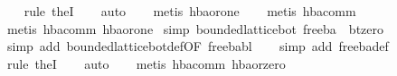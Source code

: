 \begin{isabellebody}
\ \ \isamarkupfalse%
\ {}rule\ the{}I{}{}\isanewline
\ \ \isamarkupfalse%
\ auto\isanewline
\ \ \isamarkupfalse%
\ {}metis\ hba{}or{}one{}\isanewline
\ \ \isamarkupfalse%
\ {}metis\ hba{}comm{}\isanewline
\ \ \isamarkupfalse%
\ {}metis\ hba{}comm\ hba{}or{}one{}%
\endisatagproof
{\isafoldproof}%
%
\isadelimproof
\isanewline
%
\endisadelimproof
\isanewline
{}\isamarkupfalse%
\ {}simp{}{}\ {}bounded{}lattice{}bot\ free{}ba\ {}\ bt{}zero{}\isanewline
%
\isadelimproof
\ \ %
\endisadelimproof
%
\isatagproof
{}\isamarkupfalse%
\ {}simp\ add{}\ bounded{}lattice{}bot{}def{}OF\ free{}ba{}bl{}{}\isanewline
\ \ \isamarkupfalse%
\ {}simp\ add{}\ free{}ba{}def{}\isanewline
\ \ \isamarkupfalse%
\ {}rule\ the{}I{}{}\isanewline
\ \ \isamarkupfalse%
\ auto\isanewline
\ \ \isamarkupfalse%
\ {}metis\ hba{}comm\ hba{}or{}zero{}\isanewline

\end{isabellebody}
